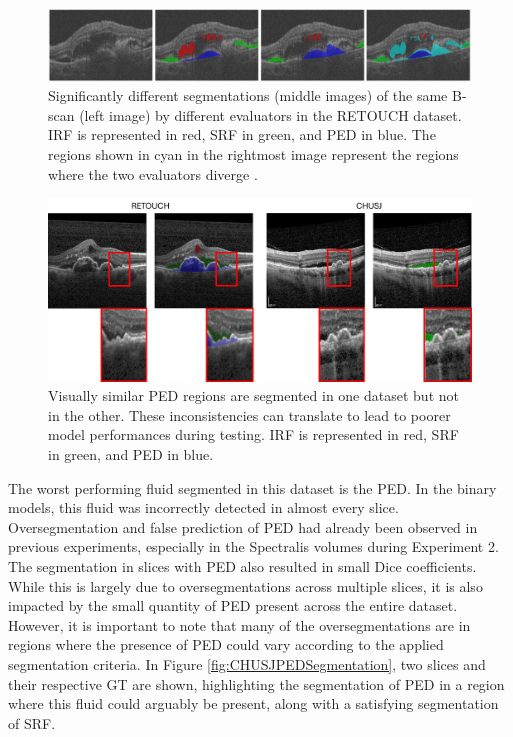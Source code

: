 \begin{figure}[!ht]
	\centering
	\includegraphics[width=1.0\linewidth]{figures/RETOUCHSegmentationDifferences.png}
	\caption{Significantly different segmentations (middle images) of the same B-scan (left image) by different evaluators in the RETOUCH dataset. IRF is represented in red, SRF in green, and PED in blue. The regions shown in cyan in the rightmost image represent the regions where the two evaluators diverge \parencite{Bogunovic2019b}.}
	\label{fig:RETOUCHSegmentationDifferences}
\end{figure}

\begin{figure}[!ht]
	\centering
	\includegraphics[width=1.0\linewidth]{figures/RETOUCHvsCHUSJSegmentationCriteria.png}
	\caption{Visually similar PED regions are segmented in one dataset but not in the other. These inconsistencies can translate to lead to poorer model performances during testing. IRF is represented in red, SRF in green, and PED in blue.}
	\label{fig:RETOUCHvsCHUSJSegmentationCriteria}
\end{figure}

The worst performing fluid segmented in this dataset is the PED. In the binary models, this fluid was incorrectly detected in almost every slice. Oversegmentation and false prediction of PED had already been observed in previous experiments, especially in the Spectralis volumes during Experiment 2. The segmentation in slices with PED also resulted in small Dice coefficients. While this is largely due to oversegmentations across multiple slices, it is also impacted by the small quantity of PED present across the entire dataset. However, it is important to note that many of the oversegmentations are in regions where the presence of PED could vary according to the applied segmentation criteria. In Figure \ref{fig:CHUSJPEDSegmentation}, two slices and their respective GT are shown, highlighting the segmentation of PED in a region where this fluid could arguably be present, along with a satisfying segmentation of SRF.

